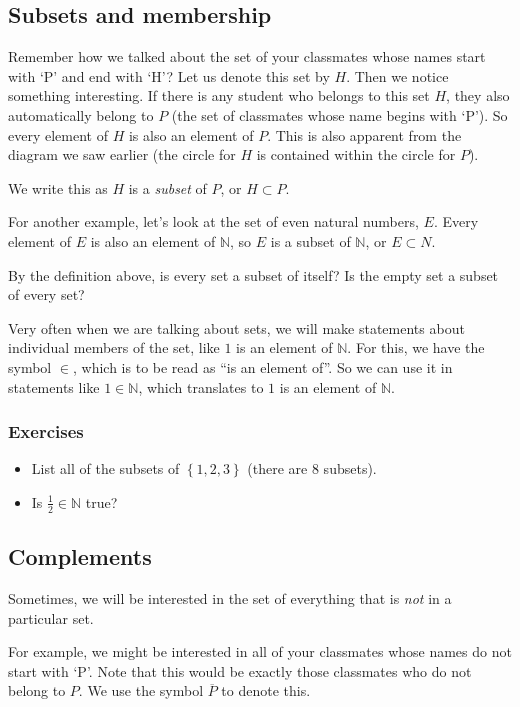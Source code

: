 \documentclass{article}
\def\N{\mathbb{N}}
\begin{document}
\subsection{Subsets and membership}
Remember how we talked about the set of your classmates whose names start
with `P' and end with `H'? Let us denote this set by $H$.
Then we notice something interesting. If there is any student who belongs
to this set $H$, they also automatically belong to $P$ (the set of classmates
whose name begins with `P').
So every element of $H$ is also an element of $P$.
This is also apparent from the diagram we saw earlier (the circle for $H$ is contained
within the circle for $P$).

We write this as $H$ is a \emph{subset} of $P$, or $H \subset P$.

For another example, let's look at the set of even natural numbers, $E$.
Every element of $E$ is also an element of $\N$, so
$E$ is a subset of $\N$, or $E \subset N$.

By the definition above, is every set a subset of itself?
Is the empty set a subset of every set?

Very often when we are talking about sets, we will make statements
about individual members of the set, like 
$1$ is an element of $\N$. For this, we have the symbol $\in$,
which is to be read as ``is an element of''.
So we can use it in statements like $1 \in \N$, which translates to
$1$ is an element of $\N$.

\subsubsection{Exercises}
\begin{itemize}
	\item List all of the subsets of $\left\{ 1, 2, 3 \right\}$
		(there are 8 subsets).
	\item Is $\frac 12 \in \N$ true?
\end{itemize}

\vspace{1em}

\subsection{Complements}
Sometimes, we will be interested in the set of everything that is \emph{not} in 
a particular set.

For example, we might be interested in all of your classmates whose names do not
start with `P'.
Note that this would be exactly those classmates who do not belong to $P$.
We use the symbol $\overline{P}$ to denote this.
\end{document}
